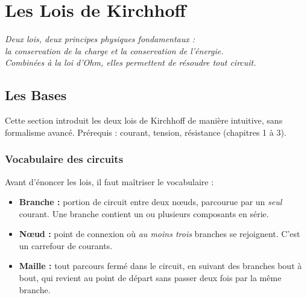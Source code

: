 \documentclass[12pt,a4paper,twoside]{book}
\begin{document}
\chapter{Les Lois de Kirchhoff}

\begin{center}
\textit{Deux lois, deux principes physiques fondamentaux :\\
la conservation de la charge et la conservation de l'énergie.\\
Combinées à la loi d'Ohm, elles permettent de résoudre tout circuit.}
\end{center}

\vspace{0.5cm}

\section{Les Bases}

\begin{bases}
Cette section introduit les deux lois de Kirchhoff de manière intuitive, sans formalisme avancé. Prérequis : courant, tension, résistance (chapitres 1 à 3).
\end{bases}

\subsection{Vocabulaire des circuits}

Avant d'énoncer les lois, il faut maîtriser le vocabulaire :

\begin{itemize}
\item \textbf{Branche :} portion de circuit entre deux n\oe uds, parcourue par un \textit{seul} courant. Une branche contient un ou plusieurs composants en série.
\item \textbf{N\oe ud :} point de connexion où \textit{au moins trois} branches se rejoignent. C'est un carrefour de courants.
\item \textbf{Maille :} tout parcours fermé dans le circuit, en suivant des branches bout à bout, qui revient au point de départ sans passer deux fois par la même branche.
\end{itemize}
\end{document}
